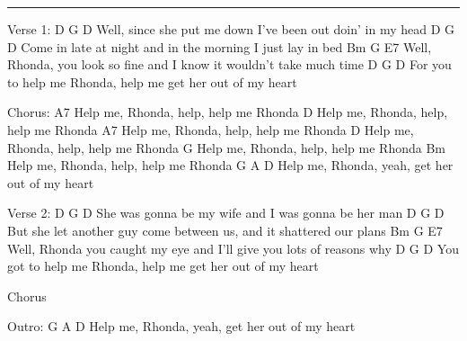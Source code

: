 \noindent\rule{\columnwidth}{1pt}
\begin{lstsong}
Verse 1:
      D                               G               D
Well, since she put me down I've been out doin' in my head
     D                           G                     D
Come in late at night and in the morning I just lay in bed
      Bm                             G                          E7
Well, Rhonda, you look so fine and I know it wouldn't take much time
           D               G                         D
For you to help me Rhonda, help me get her out of my heart

Chorus:
A7
Help me, Rhonda, help, help me Rhonda 
D
Help me, Rhonda, help, help me Rhonda 
A7
Help me, Rhonda, help, help me Rhonda 
D
Help me, Rhonda, help, help me Rhonda 
G
Help me, Rhonda, help, help me Rhonda 
Bm
Help me, Rhonda, help, help me Rhonda 
G                A                       D
Help me, Rhonda, yeah, get her out of my heart

Verse 2:
        D                    G                  D
She was gonna be my wife and I was gonna be her man
    D                          G                              D
But she let another guy come between us, and it shattered our plans
      Bm                                G                        E7
Well, Rhonda you caught my eye and I'll give you lots of reasons why
           D               G                         D
You got to help me Rhonda, help me get her out of my heart

Chorus

Outro:
G                A                       D
Help me, Rhonda, yeah, get her out of my heart
\end{lstsong}
\newpage
